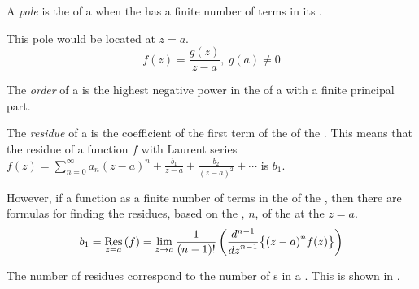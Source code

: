 \begin{definition}[Pole]\label{def:Pole}
  A \emph{pole} is the  of a  when the  has a finite number of terms in its .

  This pole would be located at $z=a$.
  \begin{equation}\label{eq:Pole}
    f(z) = \frac{g(z)}{z-a}, \: g(a) \neq 0
  \end{equation}
\end{definition}

\begin{definition}[Order]\label{def:Pole_Order}
  The \emph{order} of a  is the highest negative power in the  of a  with a finite principal part.
\end{definition}

\begin{definition}[Residue]\label{def:Residue}
  The \emph{residue} of a  is the coefficient of the first term of the  of the .
  This means that the residue of a function $f$ with Laurent series $f(z) = \sum_{n=0}^{\infty} a_{n} {(z-a)}^{n} + \frac{b_{1}}{z-a} + \frac{b_{2}}{{(z-a)}^{2}} + \cdots$ is $b_{1}$.

  However, if a function as a finite number of terms in the  of the , then there are formulas for finding the residues, based on the , $n$, of the  at the  $z=a$.
  \begin{equation}\label{eq:Residue}
    b_{1} = \Residue{f}{z=a} = \lim\limits_{z \to a} \frac{1}{(n-1)!} \left( \frac{d^{n-1}}{{dz}^{n-1}} \bigl \lbrace {(z-a)}^{n} f(z) \bigr \rbrace \right)
  \end{equation}

  The number of residues correspond to the number of s in a .
  This is shown in .
\end{definition}

